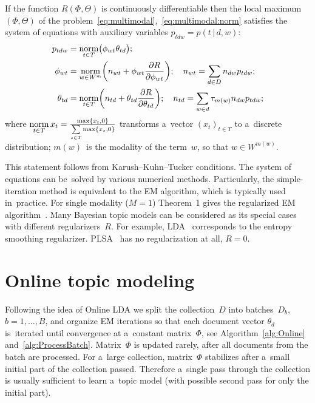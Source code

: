 \documentclass{llncs}
\newcommand{\norm}{\mathop{\rm norm}\limits}
\newcommand{\cond}{\mspace{3mu}{|}\mspace{3mu}}
\begin{document}
\begin{theorem}
\label{th:multimodal}
    If the function $R(\Phi,\Theta)$ is continuously differentiable
    then the local maximum $(\Phi,\Theta)$
    of the problem~\eqref{eq:multimodal},~\eqref{eq:multimodal:norm}
    satisfies the system of equations
    with auxiliary variables $p_{tdw} = p(t\cond d,w)$:
    \begin{align}
        \label{eq:Estep}
        p_{tdw} &= \norm_{t\in T} \bigl(\phi_{wt}\theta_{td}\bigr);
    \\
        \label{eq:Mstep:phi}
        \phi_{wt} &= \norm_{w\in W^m}
            \biggl(
                n_{wt} + \phi_{wt} \frac{\partial R}{\partial \phi_{wt}}
            \biggr);
        \quad
        n_{wt} = \sum_{d\in D} n_{dw} p_{tdw};
    \\
        \label{eq:Mstep:theta}
        \theta_{td} &= \norm_{t\in T}
            \biggl(
                n_{td} + \theta_{td} \frac{\partial R}{\partial \theta_{td}}
            \biggr);
        \quad
        n_{td} =
            \sum_{w\in d} \tau_{m(w)} n_{dw} p_{tdw};
    \end{align}
    where
    $\norm_{t\in T} x_t = \frac{\max\{x_t,0\}}{\sum\limits_{s\in T} \max\{x_s,0\}}$
    transforms a~vector $(x_t)_{t\in T}$ to a~discrete distribution;
    $m(w)$~is the modality of the term~$w$, so that $w\in W^{m(w)}$.
\end{theorem}

This statement follows from Karush--Kuhn--Tucker conditions.
The system of equations can be~solved by various numerical methods.
Particularly,
the simple-iteration method is equivalent to the EM algorithm,
which is typically used in~practice.
For single modality (${M=1}$) Theorem~1 gives the regularized EM algorithm~\cite{voron14aist,voron14mlj}.
Many Bayesian topic models can be considered as its special cases with different regularizers~$R$.
For example,
LDA~\cite{blei03latent} corresponds to the entropy smoothing regularizer.
PLSA~\cite{hofmann99plsi} has no regularization at all, ${R=0}$.

\section{Online topic modeling}
\label{sec:Online}

Following the idea of Online LDA \cite{hoffman10online}
we split the collection~$D$ into batches~$D_b$, ${b=1,\dots,B}$,
and organize EM iterations so that
each document vector $\theta_d$ is~iterated until convergence at a~constant matrix~$\Phi$,
see Algorithm~\ref{alg:Online} and~\ref{alg:ProcessBatch}.
Matrix~$\Phi$ is updated rarely, after all documents from the batch are processed.
For a~large collection,
matrix~$\Phi$ stabilizes after a~small initial part of the collection passed.
Therefore a~single pass through the collection is usually sufficient to learn a~topic model
(with possible second pass for only the initial part).
\end{document}
